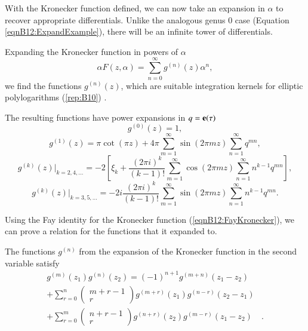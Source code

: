 With the Kronecker function defined, we can now take an expansion in $\alpha$ to recover appropriate differentials. Unlike the analogous genus 0 case (Equation \ref{eqnB12:ExpandExample}), there will be an infinite tower of differentials.

\begin{definition}
    Expanding the Kronecker function in powers of $\alpha$
    \begin{equation}
        \alpha F(z,\alpha) = \sum_{n=0}^{\infty} g^{(n)}(z) \alpha^n,
    \end{equation}
    we find the functions $g^{(n)}(z)$, which are suitable integration kernels for elliptic polylogarithms (\ref{rep:B10}) \cite{Broedel_2022}.
\end{definition}

The resulting functions have power expansions in $q = \mathbf{e}(\tau)$ \cite{Broedel_2015}
\begin{equation}
    g^{(0)}(z) = 1,
\end{equation}
\begin{equation}
    g^{(1)}(z) = \pi \cot(\pi z) + 4 \pi \sum_{m=1}^\infty \sin(2 \pi m z) \sum_{n=1}^\infty q^{mn},
\end{equation}
\begin{equation}
    g^{(k)}(z)\big|_{k=2,4,\ldots} = -2\left[\xi_k + \frac{(2\pi i)^k}{(k-1)!} \sum_{m=1}^\infty \cos(2 \pi m z) \sum_{n=1}^\infty n^{k-1} q^{mn} \right],
\end{equation}
\begin{equation}
    g^{(k)}(z)\big|_{k=3,5,\ldots} = -2i \frac{(2\pi i)^k}{(k-1)!} \sum_{m=1}^\infty \sin(2\pi mz) \sum_{n=1}^\infty n^{k-1} q^{mn}.
\end{equation}

Using the Fay identity for the Kronecker function (\ref{eqnB12:FayKronecker}), we can prove a relation for the functions that it expanded to.

\begin{lemma}
    The functions $g^{(n)}$ from the expansion of the Kronecker function in the second variable satisfy
    \begin{align}
        g^{(m)}(z_1) g^{(n)}(z_2) = (-1)^{n+1} g^{(m+n)}(z_1-z_2)& \\
         +\sum_{r=0}^n \begin{pmatrix} m+r-1 \\ r \end{pmatrix} g^{(m+r)}(z_1) g^{(n-r)}(z_2-z_1) & \\
         +\sum_{r=0}^m \begin{pmatrix} n+r-1 \\ r \end{pmatrix} g^{(n+r)}(z_2) g^{(m-r)}(z_1-z_2) & .
    \end{align}
\end{lemma}

